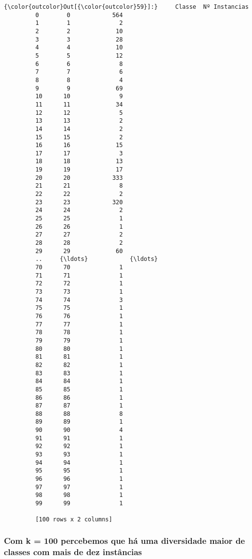 \documentclass[11pt]{article}
\begin{document}
\begin{Verbatim}[commandchars=\\\{\}]
{\color{outcolor}Out[{\color{outcolor}59}]:}     Classe  Nº Instancias
         0        0            564
         1        1              2
         2        2             10
         3        3             28
         4        4             10
         5        5             12
         6        6              8
         7        7              6
         8        8              4
         9        9             69
         10      10              9
         11      11             34
         12      12              5
         13      13              2
         14      14              2
         15      15              2
         16      16             15
         17      17              3
         18      18             13
         19      19             17
         20      20            333
         21      21              8
         22      22              2
         23      23            320
         24      24              2
         25      25              1
         26      26              1
         27      27              2
         28      28              2
         29      29             60
         ..     {\ldots}            {\ldots}
         70      70              1
         71      71              1
         72      72              1
         73      73              1
         74      74              3
         75      75              1
         76      76              1
         77      77              1
         78      78              1
         79      79              1
         80      80              1
         81      81              1
         82      82              1
         83      83              1
         84      84              1
         85      85              1
         86      86              1
         87      87              1
         88      88              8
         89      89              1
         90      90              4
         91      91              1
         92      92              1
         93      93              1
         94      94              1
         95      95              1
         96      96              1
         97      97              1
         98      98              1
         99      99              1
         
         [100 rows x 2 columns]
\end{Verbatim}
            
    \subsubsection{Com k = 100 percebemos que há uma diversidade maior de
classes com mais de dez
instâncias}\label{com-k-100-percebemos-que-huxe1-uma-diversidade-maior-de-classes-com-mais-de-dez-instuxe2ncias}
\end{document}
